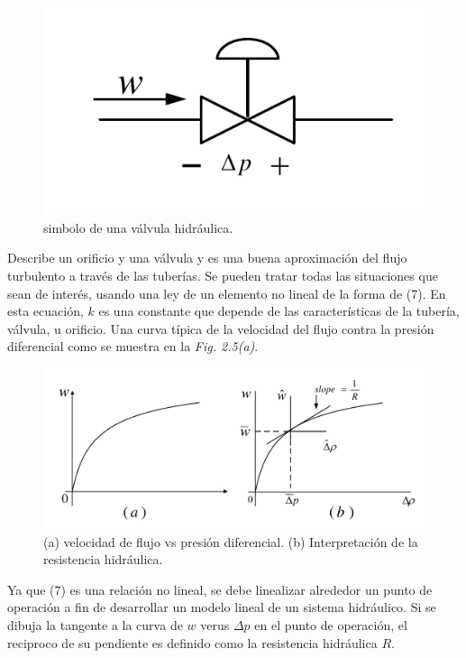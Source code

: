 \documentclass[a4paper,12pt,twoside]{proyectotanquesecci}
\begin{document}
\begin{figure}[h]
\centering
\includegraphics[scale=0.5]{Figura4}
\renewcommand{\figurename}{Fig.}
\caption{simbolo de una válvula hidráulica.}
\label{simbolo de una válvula hidráulica.}
\end{figure}

Describe un orificio y una válvula y es una buena aproximación del flujo turbulento a través de las tuberías. Se pueden tratar todas las situaciones que sean de interés, usando una ley de un elemento no lineal de la forma de (7). En esta ecuación, $k$ es una constante que depende de las características de la tubería, válvula, u orificio. Una curva típica de la velocidad del flujo contra la presión diferencial como se muestra en la \textit{Fig. 2.5(a)}.

\begin{figure}[h]
\centering
\includegraphics[scale=0.5]{Figura5}
\renewcommand{\figurename}{Fig.}
\caption{(a) velocidad de flujo vs presión diferencial. (b) Interpretación de la resistencia hidráulica.}
\label{(a) velocidad de flujo vs presión diferencial. (b) Interpretación de la resistencia hidráulica.}
\end{figure}

Ya que (7) es una relación no lineal, se debe linealizar alrededor un punto de operación a fin de desarrollar un modelo lineal de un sistema hidráulico.
Si se dibuja la tangente a la curva de $w$ verus $\Delta p$  en el punto de operación, el reciproco de su pendiente es definido como la resistencia hidráulica $R$. \\
\end{document}
